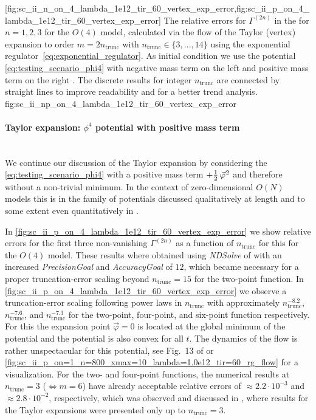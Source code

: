 	[fig:sc_ii_n_on_4_lambda_1e12_tir_60_vertex_exp_error,fig:sc_ii_p_on_4_lambda_1e12_tir_60_vertex_exp_error]%
	{%
		The relative errors for $\Gamma^{(2n)}$ in the \ir{} for $n = 1, 2, 3$ for the $O (4)$ model, calculated via the \frg{} flow of the Taylor (vertex) expansion to order $m = 2 n_\mathrm{trunc}$ with $n_\mathrm{trunc} \in \{ 3, \ldots , 14 \}$ using the exponential regulator~\eqref{eq:exponential_regulator}.
		As initial condition we use the \uv{} potential \eqref{eq:testing_scenario_phi4} with negative mass term on the left  and positive mass term on the right .
		The discrete results for integer $n_\mathrm{trunc}$ are connected by straight lines to improve readability and for a better trend analysis.
	}%
	{fig:sc_ii_np_on_4_lambda_1e12_tir_60_vertex_exp_error}%
\paragraph{\frg{} Taylor expansion: $\phi^4$ potential with positive mass term}\label{paragraph:sc2taylorPhiP}\mbox{}\\
We continue our discussion of the \frg{} Taylor expansion by considering the \ic{} \eqref{eq:testing_scenario_phi4} with a positive mass term $+\tfrac{1}{2} \, \vec{\varphi}^{\mskip1.0mu 2}$ and therefore without a non-trivial minimum.
In the context of zero-dimensional $O(N)$ models this \ic{} is in the family of \uv{} potentials discussed qualitatively at length and to some extent even quantitatively in .

In \cref{fig:sc_ii_p_on_4_lambda_1e12_tir_60_vertex_exp_error} we show relative errors for the first three non-vanishing $\Gamma^{(2n)}$ as a function of $n_\mathrm{trunc}$ for this \ic{} for the $O(4)$ model.
These results where obtained using \textit{NDSolve} of \WAMXIIwR{} with an increased \textit{PrecisionGoal} and \textit{AccuracyGoal} of $12$, which became necessary for a proper truncation-error scaling beyond $n_\mathrm{trunc}=15$ for the two-point function.
In \cref{fig:sc_ii_p_on_4_lambda_1e12_tir_60_vertex_exp_error} we observe a truncation-error scaling following power laws in $n_\mathrm{trunc}$ with approximately $n_\mathrm{trunc}^{-8.2}$, $n_\mathrm{trunc}^{-7.6}$, and $n_\mathrm{trunc}^{-7.3}$ for the two-point, four-point, and six-point function respectively.
For this \ic{} the expansion point $\vec{\varphi} = 0$ is located at the global minimum of the potential and the potential is also convex for all $t$.
The dynamics of the \frg{} flow is rather unspectacular for this potential, see Fig.\ 13 of  or \cref{fig:sc_ii_p_on=1_n=800_xmax=10_lambda=1.0e12_tir=60_rg_flow} for a visualization.
For the two- and four-point functions, the numerical results at $n_\mathrm{trunc}=3$ ($\Leftrightarrow m=6$) have already acceptable relative errors of $\approx 2.2 \cdot 10^{-3}$ and $\approx 2.8 \cdot 10^{-2}$, respectively, which was observed and discussed in , where results for the Taylor expansions were presented only up to $n_\mathrm{trunc}=3$.
	
